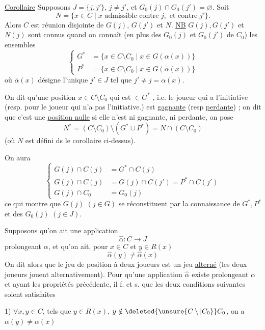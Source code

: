 \uline{Corollaire} Supposons $J=\{j,j'\}$, $j\ne j'$, et \margin{$\vert$} $G_0(j)\cap G_0(j')=\varnothing$. Soit 
\[
 N=\{x\in C\mid x\text{ admissible contre }j,\text{ et contre }j'\}.
\]
\margin{$\big\vert$} Alors $C$ est réunion disjointe de $G(j)$, $G(j')$ et $N$.
 \uline{NB} $G(j),G(j')$ et $N(j)$ sont connus quand on connaît (en plus des  $G_0(j)$ et $G_0(j')$ de $C_0$) les ensembles
\[
 \left\{\begin{aligned}
 G^*&=\{x\in C\setminus C_0\mid x\in G(\alpha(x))\}\\
 P^*&=\{x\in C\setminus C_0\mid x\in G(\bar\alpha(x))\}
 \end{aligned}\right.
\]
où $\bar\alpha(x)$ désigne l'unique $j'\in J$ tel que $j'\ne j=\alpha(x)$.

On dit qu'une position $x\in C\setminus C_0$ qui est $\in G^*$ , i.e.    le joueur qui a l'initiative (resp. pour le joueur qui n'a pas l'initiative.) est \uline{gagnante} (resp \uline{perdante}) ; on dit que c'est une \uline{position nulle}  si elle n'est ni gagnante, ni perdante, on pose
\[
 N^*=(C\setminus C_0)\setminus(G^*\cup P^*)=N\cap(C\setminus C_0)
\]
(où $N$ est défini ds le corollaire ci-dessus).

On aura
\[
 \left\{\begin{aligned}
 G(j)\cap C(j)&=G^*\cap C(j)\\
 G(j)\cap\bar C(j)&=G(j)\cap C(j')=P^*\cap C(j')\\
 G(j)\cap C_0&=G_0(j)
 \end{aligned}\right.
\]
ce qui montre que  $G(j)$ $(j\in G)$ se réconstituent par la connaissance de $G^*,P^*$ et des $G_0(j)$ $(j\in J)$.

Supposons qu'on ait une application
\[
 \hat\alpha:C\longrightarrow J
\]
prolongeant $\alpha$, et qu'on ait, pour  $x\in C$ et $y\in R(x)$
\[
 \hat\alpha(y)\ne\hat\alpha(x)
\]
On dit alors que le jeu  de position à deux joueurs est un jeu \uline{alterné} (les deux joueurs jouent alternativement). Pour qu'une application $\hat\alpha$ existe prolongeant $\alpha$ et ayant les propriétés précédente, il f. et s. que les deux conditions suivantes soient satisfaites

1) $\forall x,y\in C$, tels que $y\in R(x)$, $y\notin \deleted{\unsure{C\setminus|C_0}} C_0$, on a $\alpha(y)\ne\alpha(x)$

